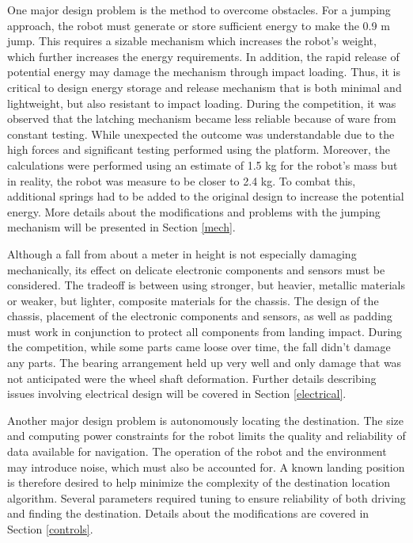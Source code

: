 \documentclass[ece]{uw-wkrpt}
\begin{document}
One major design problem is the method to overcome obstacles. For a jumping approach, the robot must generate or store sufficient energy to make the 0.9 m jump. This requires a sizable mechanism which increases the robot’s weight, which further increases the energy requirements. In addition, the rapid release of potential energy may damage the mechanism through impact loading. Thus, it is critical to design energy storage and release mechanism that is both minimal and lightweight, but also resistant to impact loading. During the competition, it was observed that the latching mechanism became less reliable because of ware from constant testing. While unexpected the outcome was understandable due to the high forces and significant testing performed using the platform. Moreover, the calculations were performed using an estimate of 1.5 kg for the robot's mass but in reality, the robot was measure to be closer to 2.4 kg. To combat this, additional springs had to be added to the original design to increase the potential energy. More details about the modifications and problems with the jumping mechanism will be presented in Section \ref{mech}.

Although a fall from about a meter in height is not especially damaging mechanically, its effect on delicate electronic components and sensors must be considered. The tradeoff is between using stronger, but heavier, metallic materials or weaker, but lighter, composite materials for the chassis. The design of the chassis, placement of the electronic components and sensors, as well as padding must work in conjunction to protect all components from landing impact. During the competition, while some parts came loose over time, the fall didn’t damage any parts. The bearing arrangement held up very well and only damage that was not anticipated were the wheel shaft deformation. Further details describing issues involving electrical design will be covered in Section \ref{electrical}.

Another major design problem is autonomously locating the destination. The size and computing power constraints for the robot limits the quality and reliability of data available for navigation. The operation of the robot and the environment may introduce noise, which must also be accounted for. A known landing position is therefore desired to help minimize the complexity of the destination location algorithm. Several parameters required tuning to ensure reliability of both driving and finding the destination. Details about the modifications are covered in Section \ref{controls}. 
\end{document}
